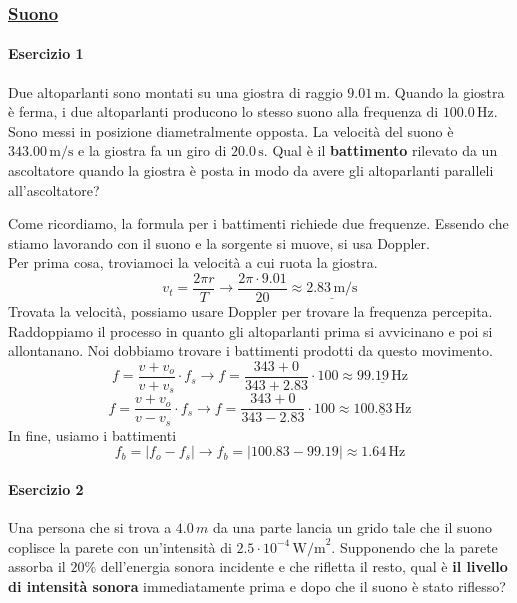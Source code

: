 \subsubsection*{\hyperref[subsec:onde:suono]{Suono}}\label{ex:suono}

\paragraph{Esercizio 1}
Due altoparlanti sono montati su una giostra di raggio $9.01\,\text{m}$. Quando la giostra è ferma, i 
due altoparlanti producono lo stesso suono alla frequenza di $100.0\,\text{Hz}$. Sono messi in 
posizione diametralmente opposta. La velocità del suono è $343.00\,\text{m/s}$ e la giostra fa un 
giro di $20.0\,\text{s}$. Qual è il \textbf{battimento} rilevato da un ascoltatore quando la giostra 
è posta in modo da avere gli altoparlanti paralleli all'ascoltatore?
\divisor

Come ricordiamo, la formula per i battimenti richiede due frequenze. Essendo che stiamo lavorando 
con il suono e la sorgente si muove, si usa Doppler.\\
Per prima cosa, troviamoci la velocità a cui ruota la giostra.
\begin{equation*}
  v_t = \frac{2\pi r}{T} \rightarrow \frac{2\pi\cdot 9.01}{20} \approx \underline{2.83\,\text{m/s}}
\end{equation*}
Trovata la velocità, possiamo usare Doppler per trovare la frequenza percepita. Raddoppiamo il 
processo in quanto gli altoparlanti prima si avvicinano e poi si allontanano. Noi dobbiamo trovare
i battimenti prodotti da questo movimento.
\begin{equation*}
  f = \frac{v + v_o}{v + v_s}\cdot f_s \rightarrow f = \frac{343+0}{343+2.83}\cdot 100
  \approx\underline{99.19\,\text{Hz}}
\end{equation*}
\begin{equation*}
  f = \frac{v + v_o}{v - v_s}\cdot f_s \rightarrow f = \frac{343+0}{343-2.83}\cdot 100
  \approx\underline{100.83\,\text{Hz}}
\end{equation*}
In fine, usiamo i battimenti
\begin{equation*}
  f_b = \left\vert f_o - f_s \right\vert \rightarrow f_b = \left\vert 100.83-99.19 \right\vert
  \approx\boxed{1.64\,\text{Hz}}
\end{equation*}


\paragraph{Esercizio 2}
Una persona che si trova a $4.0\,m$ da una parte lancia un grido tale che il suono coplisce la 
parete con un'intensità di $2.5\cdot10^{-4}\,\text{W/m}^2$. Supponendo che la parete assorba il $20\%$
dell'energia sonora incidente e che rifletta il resto, qual è \textbf{il livello di intensità 
sonora} immediatamente prima e dopo che il suono è stato riflesso?
\divisor

